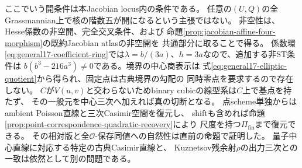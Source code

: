 ここでいう開条件は本Jacobian locus内の条件である。
任意の$(U,Q)$の全Grassmannian上で核の階数五が開になるという主張ではない。
非空性は、Hesse係数の非空開、完全交叉条件、および
命題\ref{prop:jacobian-affine-four-morphism}の既約Jacobian atlasの非空開を
共通部分に取ることで得る。
係数環\eqref{eq:general17-coefficient-ring}では$\lambda=b/(3a)$、$h=3a$なので、追加する非ST条件は
$b(b^3-216a^3)\ne0$である。境界の中心商表示は
式\eqref{eq:general17-elliptic-quotient}から得られ、固定点は古典境界の勾配の
同時零点を要求するので存在しない。
$C$が$V(u,v)$と交わらないためbinary cubicの線型系は$C$上で基点を持たず、
その一般元を中心三次へ加えれば真の切断となる。
点scheme単独からはambient Poisson直線と三次Casimir空間を復元し、
shiftも含めれば命題\ref{prop:point-correspondence-quadratic-recovery}により
尺度を持つ$\Pi_{\mathrm{fin}}$まで復元できる。
その相対版と全$\mathcal O$-保存同値への自然性は直前の命題で証明した。
量子中心直線に対応する特定の古典Casimir直線と、
Kuznetsov残余射$\rho$の出力三次との一致は依然として別の問題である。
